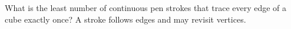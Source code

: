 What is the least number of continuous pen strokes that trace every edge of a cube exactly once? A stroke follows edges and may revisit vertices.

